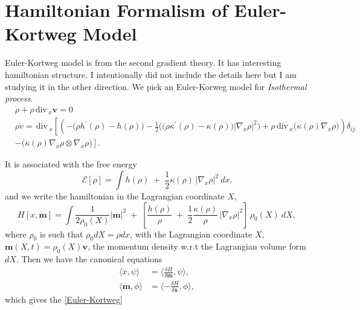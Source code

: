 \documentclass[a4paper,12pt]{article}
\def\div{\,\textrm{div}\,}
\begin{document}
\section{Hamiltonian Formalism of Euler-Kortweg Model}
Euler-Kortweg model is from the second gradient theory. It has interesting hamiltonian structure. I intentionally did not include the details here but I am studying it in the other direction. We pick an Euler-Korweg model for {\it Isothermal process}.
\begin{equation} \label{Euler-Kortweg}
\begin{aligned}
 &\dot{\rho} + \rho \div_x \mathbf{v} = 0 \\
 &\rho \dot{v} = \div_x \left[\left(-\big(\rho h^\prime(\rho)- h(\rho)\big) -\frac{1}{2} \Big(\big(\rho\kappa^\prime(\rho)-\kappa(\rho)\big)|\nabla_x\rho|^2\Big) + \rho\div_x\big(\kappa(\rho)\nabla_x \rho\big)\right)\delta_{ij}\right.\\
 &\left. -\Big(\kappa(\rho)\nabla_x\rho \otimes \nabla_x \rho\Big)\right].
\end{aligned}
\end{equation}

It is associated with the free energy
\begin{equation}
 \mathcal{E}[\rho] = \int h(\rho) \;+\; \frac{1}{2}\kappa(\rho)\, |\nabla_x\rho|^2 \:dx.
\end{equation}
and we write the hamiltonian in the Lagrangian coordinate $X$,
\begin{equation}
 H[x, \mathbf{m}] = \int \frac{1}{2\rho_0(X)} | \mathbf{m} |^2 \;+\; \left[\frac{h(\rho)}{\rho} \;+\; \frac{1}{2}\frac{\kappa(\rho)}{\rho} \, |\nabla_x \rho|^2\right] \, \rho_0(X) \:dX,
\end{equation}
where $\rho_0$ is such that $\rho_0dX = \rho dx$, with the Lagrangian coordinate $X$, $\mathbf{m}(X,t)=\rho_0(X) \mathbf{v}$, the momentum density w.r.t the Lagrangian volume form $dX$. Then we have the canonical equations
\begin{align}
 \langle \dot{x}, \psi \rangle &= \langle \frac{\delta H}{\delta \mathbf{m}}, \psi \rangle, \label{eq:xdot}\\
 \langle \dot{\mathbf{m}}, \phi \rangle &= \langle -\frac{\delta H}{\delta \mathbf{x}}, \phi \rangle, \label{eq:mdot}
\end{align} 
which gives the \eqref{Euler-Kortweg}
\end{document}
